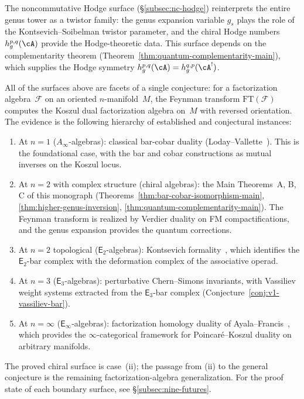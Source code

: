 The noncommutative Hodge surface (\S\ref{subsec:nc-hodge})
reinterprets the entire genus tower as a twistor family: the
genus expansion variable $g_s$ plays the role of the
Kontsevich--Soibelman twistor parameter, and the chiral Hodge
numbers $h^{p,q}_g(\cA)$ provide the Hodge-theoretic data.
This surface depends on the complementarity theorem
(Theorem~\ref{thm:quantum-complementarity-main}), which supplies
the Hodge symmetry $h^{p,q}_g(\cA) = h^{q,p}_g(\cA^!)$.

\begin{remark}\label{rem:unifying-vision}
All of the surfaces above are facets of a single conjecture:
for a factorization algebra~$\mathcal{F}$ on an oriented
$n$-manifold~$M$, the Feynman transform
$\mathrm{FT}(\mathcal{F})$ computes the Koszul dual
factorization algebra on~$M$ with reversed orientation.
The evidence is the following hierarchy of established and
conjectural instances:
\begin{enumerate}[label=\textup{(\roman*)}]
\item At $n = 1$ \textup{(}$A_\infty$-algebras\textup{)}:
 classical bar-cobar duality
 \textup{(}Loday--Vallette~\cite{LV12}\textup{)}. This is the
 foundational case, with the bar and cobar constructions as mutual
 inverses on the Koszul locus.
\item At $n = 2$ with complex structure
 \textup{(}chiral algebras\textup{)}: the Main Theorems~A, B, C
 of this monograph
 \textup{(}Theorems~\ref{thm:bar-cobar-isomorphism-main},
 \ref{thm:higher-genus-inversion},
 \ref{thm:quantum-complementarity-main}\textup{)}. The Feynman
 transform is realized by Verdier duality on FM compactifications,
 and the genus expansion provides the quantum corrections.
\item At $n = 2$ topological
 \textup{(}$\mathsf{E}_2$-algebras\textup{)}: Kontsevich
 formality~\cite{Kon03}, which identifies the $\mathsf{E}_2$-bar
 complex with the deformation complex of the associative operad.
\item At $n = 3$
 \textup{(}$\mathsf{E}_3$-algebras\textup{)}:
 perturbative Chern--Simons invariants, with Vassiliev weight
 systems extracted from the $\mathsf{E}_3$-bar complex
 \textup{(}Conjecture~\ref{conj:v1-vassiliev-bar}\textup{)}.
\item At $n = \infty$
 \textup{(}$\mathsf{E}_\infty$-algebras\textup{)}:
 factorization homology duality of
 Ayala--Francis~\cite{AF15}, which provides the
 $\infty$-categorical framework for Poincar\'e--Koszul
 duality on arbitrary manifolds.
\end{enumerate}
The proved chiral surface is case~\textup{(ii)}; the passage
from (ii) to the general conjecture is the remaining
factorization-algebra generalization. For the proof state of
each boundary surface, see
\S\ref{subsec:nine-futures}.
\end{remark}



